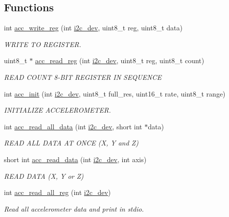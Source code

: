 \subsection*{Functions}
\begin{DoxyCompactItemize}
\item 
int \hyperlink{group__acc_ga534116416343122de29a5b6ade6876bd}{acc\-\_\-write\-\_\-reg} (int \hyperlink{CommunicationV0_2communication_8c_a7751bd45ac1064efb35adf1f19c25db8}{i2c\-\_\-dev}, uint8\-\_\-t reg, uint8\-\_\-t data)
\begin{DoxyCompactList}\small\item\em W\-R\-I\-T\-E T\-O R\-E\-G\-I\-S\-T\-E\-R. \end{DoxyCompactList}\item 
uint8\-\_\-t $\ast$ \hyperlink{group__acc_ga2a91c44eebbe44f4d3b8c508633512f9}{acc\-\_\-read\-\_\-reg} (int \hyperlink{CommunicationV0_2communication_8c_a7751bd45ac1064efb35adf1f19c25db8}{i2c\-\_\-dev}, uint8\-\_\-t reg, uint8\-\_\-t count)
\begin{DoxyCompactList}\small\item\em R\-E\-A\-D C\-O\-U\-N\-T 8-\/\-B\-I\-T R\-E\-G\-I\-S\-T\-E\-R I\-N S\-E\-Q\-U\-E\-N\-C\-E \end{DoxyCompactList}\item 
int \hyperlink{group__acc_gae8f9cc6e0d15e61039d846305f86f073}{acc\-\_\-init} (int \hyperlink{CommunicationV0_2communication_8c_a7751bd45ac1064efb35adf1f19c25db8}{i2c\-\_\-dev}, uint8\-\_\-t full\-\_\-res, uint16\-\_\-t rate, uint8\-\_\-t range)
\begin{DoxyCompactList}\small\item\em I\-N\-I\-T\-I\-A\-L\-I\-Z\-E A\-C\-C\-E\-L\-E\-R\-O\-M\-E\-T\-E\-R. \end{DoxyCompactList}\item 
int \hyperlink{group__acc_ga013bb5ed8a763883fc440549d2b1a6ce}{acc\-\_\-read\-\_\-all\-\_\-data} (int \hyperlink{CommunicationV0_2communication_8c_a7751bd45ac1064efb35adf1f19c25db8}{i2c\-\_\-dev}, short int $\ast$data)
\begin{DoxyCompactList}\small\item\em R\-E\-A\-D A\-L\-L D\-A\-T\-A A\-T O\-N\-C\-E (X, Y and Z) \end{DoxyCompactList}\item 
short int \hyperlink{group__acc_ga041d6953f2bfc8c5efa4d5bbac812305}{acc\-\_\-read\-\_\-data} (int \hyperlink{CommunicationV0_2communication_8c_a7751bd45ac1064efb35adf1f19c25db8}{i2c\-\_\-dev}, int axis)
\begin{DoxyCompactList}\small\item\em R\-E\-A\-D D\-A\-T\-A (X, Y or Z) \end{DoxyCompactList}\item 
int \hyperlink{group__acc_ga8509cccabb08e7267677f66f25718731}{acc\-\_\-read\-\_\-all\-\_\-reg} (int \hyperlink{CommunicationV0_2communication_8c_a7751bd45ac1064efb35adf1f19c25db8}{i2c\-\_\-dev})
\begin{DoxyCompactList}\small\item\em Read all accelerometer data and print in stdio. \end{DoxyCompactList}\end{DoxyCompactItemize}


